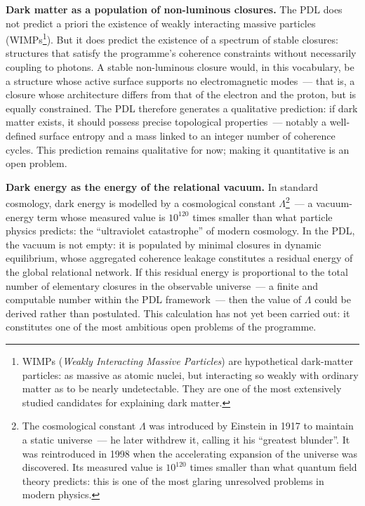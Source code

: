 \documentclass[12pt, a4paper, openright]{book}
\begin{document}
\textbf{Dark matter as a population of non-luminous closures.} The PDL does not predict a priori the existence of weakly interacting massive particles (WIMPs\footnote{WIMPs (\textit{Weakly Interacting Massive Particles}) are hypothetical dark-matter particles: as massive as atomic nuclei, but interacting so weakly with ordinary matter as to be nearly undetectable. They are one of the most extensively studied candidates for explaining dark matter.}). But it does predict the existence of a spectrum of stable closures: structures that satisfy the programme's coherence constraints without necessarily coupling to photons. A stable non-luminous closure would, in this vocabulary, be a structure whose active surface supports no electromagnetic modes~--- that is, a closure whose architecture differs from that of the electron and the proton, but is equally constrained. The PDL therefore generates a qualitative prediction: if dark matter exists, it should possess precise topological properties~--- notably a well-defined surface entropy and a mass linked to an integer number of coherence cycles. This prediction remains qualitative for now; making it quantitative is an open problem.

\medskip

\textbf{Dark energy as the energy of the relational vacuum.} In standard cosmology, dark energy is modelled by a cosmological constant $\Lambda$\footnote{The cosmological constant $\Lambda$ was introduced by Einstein in 1917 to maintain a static universe~--- he later withdrew it, calling it his ``greatest blunder''. It was reintroduced in 1998 when the accelerating expansion of the universe was discovered. Its measured value is $10^{120}$ times smaller than what quantum field theory predicts: this is one of the most glaring unresolved problems in modern physics.}~--- a vacuum-energy term whose measured value is $10^{120}$ times smaller than what particle physics predicts: the ``ultraviolet catastrophe'' of modern cosmology. In the PDL, the vacuum is not empty: it is populated by minimal closures in dynamic equilibrium, whose aggregated coherence leakage constitutes a residual energy of the global relational network. If this residual energy is proportional to the total number of elementary closures in the observable universe~--- a finite and computable number within the PDL framework~--- then the value of $\Lambda$ could be derived rather than postulated. This calculation has not yet been carried out: it constitutes one of the most ambitious open problems of the programme.
\end{document}
